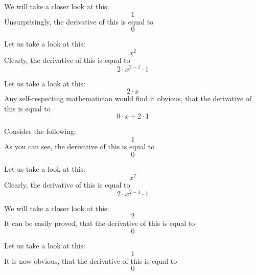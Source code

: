 \documentclass{article}
\begin{document}
We will take a closer look at this:
\begin{equation}
1 
\end{equation}
Unsurprisingly, the derivative of this is equal to
\begin{equation}
0 
\end{equation}

Let us take a look at this:
\begin{equation}
x ^{2 } 
\end{equation}
Clearly, the derivative of this is equal to
\begin{equation}
2 \cdot x ^{2 - 1 } \cdot 1 
\end{equation}

Let us take a look at this:
\begin{equation}
2 \cdot x 
\end{equation}
Any self-respecting mathematician would find it obvious, that the derivative of this is equal to
\begin{equation}
0 \cdot x + 2 \cdot 1 
\end{equation}

Consider the following:
\begin{equation}
1 
\end{equation}
As you can see, the derivative of this is equal to
\begin{equation}
0 
\end{equation}

Let us take a look at this:
\begin{equation}
x ^{2 } 
\end{equation}
Clearly, the derivative of this is equal to
\begin{equation}
2 \cdot x ^{2 - 1 } \cdot 1 
\end{equation}

We will take a closer look at this:
\begin{equation}
2 
\end{equation}
It can be easily proved, that the derivative of this is equal to
\begin{equation}
0 
\end{equation}

Let us take a look at this:
\begin{equation}
1 
\end{equation}
It is now obvious, that the derivative of this is equal to
\begin{equation}
0 
\end{equation}
\end{document}

